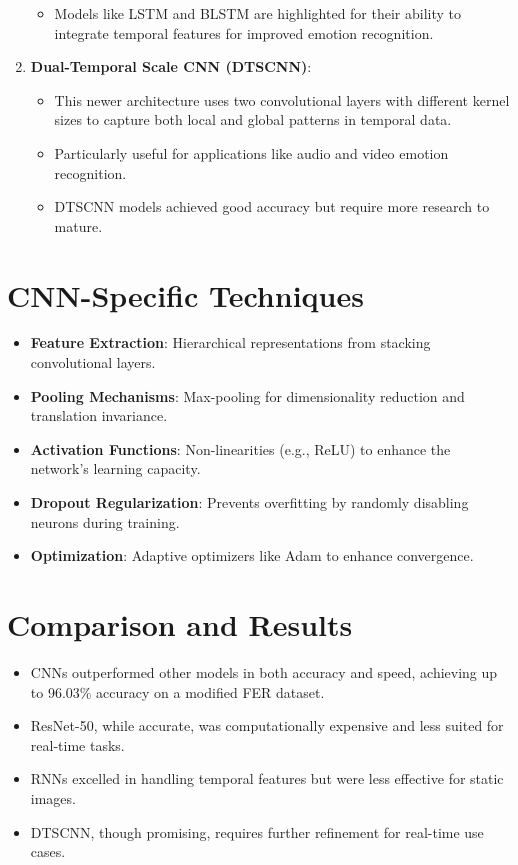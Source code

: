 \documentclass{article}
\begin{document}
\begin{enumerate}
\begin{itemize}
        \item Models like LSTM and BLSTM are highlighted for their ability to integrate temporal features for improved emotion recognition.
    \end{itemize}
    \item \textbf{Dual-Temporal Scale CNN (DTSCNN)}:
    \begin{itemize}
        \item This newer architecture uses two convolutional layers with different kernel sizes to capture both local and global patterns in temporal data.
        \item Particularly useful for applications like audio and video emotion recognition.
        \item DTSCNN models achieved good accuracy but require more research to mature.
    \end{itemize}
\end{enumerate}

\section*{CNN-Specific Techniques}
\begin{itemize}
    \item \textbf{Feature Extraction}: Hierarchical representations from stacking convolutional layers.
    \item \textbf{Pooling Mechanisms}: Max-pooling for dimensionality reduction and translation invariance.
    \item \textbf{Activation Functions}: Non-linearities (e.g., ReLU) to enhance the network's learning capacity.
    \item \textbf{Dropout Regularization}: Prevents overfitting by randomly disabling neurons during training.
    \item \textbf{Optimization}: Adaptive optimizers like Adam to enhance convergence.
\end{itemize}

\section*{Comparison and Results}
\begin{itemize}
    \item CNNs outperformed other models in both accuracy and speed, achieving up to 96.03\% accuracy on a modified FER dataset.
    \item ResNet-50, while accurate, was computationally expensive and less suited for real-time tasks.
    \item RNNs excelled in handling temporal features but were less effective for static images.
    \item DTSCNN, though promising, requires further refinement for real-time use cases.
\end{itemize}
\end{document}
